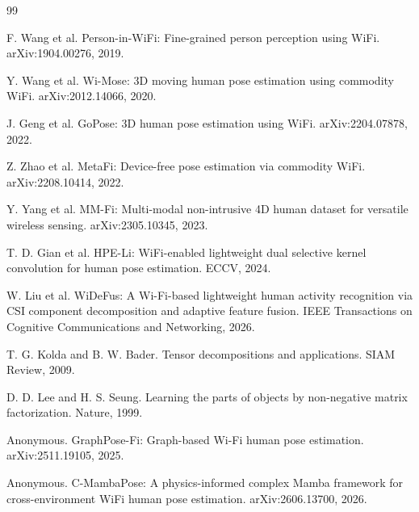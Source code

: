 \documentclass[letterpaper]{article}
\begin{document}

\begin{thebibliography}{99}

F. Wang et al.
\newblock Person-in-WiFi: Fine-grained person perception using WiFi.
\newblock arXiv:1904.00276, 2019.

Y. Wang et al.
\newblock Wi-Mose: 3D moving human pose estimation using commodity WiFi.
\newblock arXiv:2012.14066, 2020.

J. Geng et al.
\newblock GoPose: 3D human pose estimation using WiFi.
\newblock arXiv:2204.07878, 2022.

Z. Zhao et al.
\newblock MetaFi: Device-free pose estimation via commodity WiFi.
\newblock arXiv:2208.10414, 2022.

Y. Yang et al.
\newblock MM-Fi: Multi-modal non-intrusive 4D human dataset for versatile wireless sensing.
\newblock arXiv:2305.10345, 2023.

T. D. Gian et al.
\newblock HPE-Li: WiFi-enabled lightweight dual selective kernel convolution for human pose estimation.
\newblock ECCV, 2024.

W. Liu et al.
\newblock WiDeFus: A Wi-Fi-based lightweight human activity recognition via CSI component decomposition and adaptive feature fusion.
\newblock IEEE Transactions on Cognitive Communications and Networking, 2026.

T. G. Kolda and B. W. Bader.
\newblock Tensor decompositions and applications.
\newblock SIAM Review, 2009.

D. D. Lee and H. S. Seung.
\newblock Learning the parts of objects by non-negative matrix factorization.
\newblock Nature, 1999.

Anonymous.
\newblock GraphPose-Fi: Graph-based Wi-Fi human pose estimation.
\newblock arXiv:2511.19105, 2025.

Anonymous.
\newblock C-MambaPose: A physics-informed complex Mamba framework for cross-environment WiFi human pose estimation.
\newblock arXiv:2606.13700, 2026.

\end{thebibliography}
\end{document}
